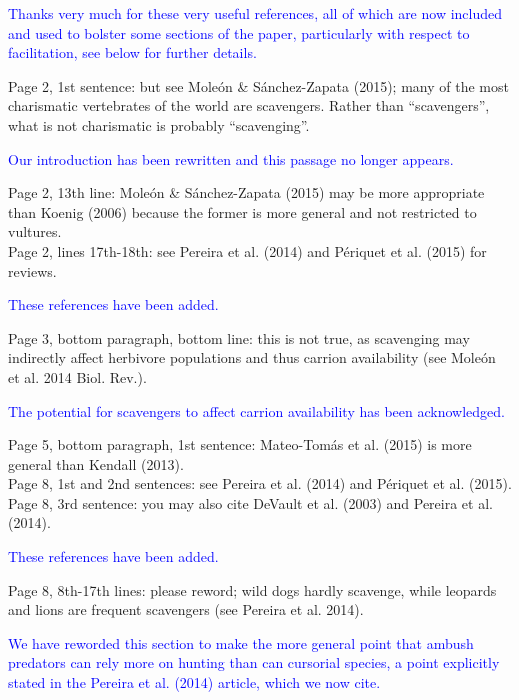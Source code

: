 \documentclass[12pt,letterpaper]{article}
\begin{document}
{\begin{enumerate}
\textcolor{blue}{Thanks very much for these very useful references, all of which are now included and used to bolster some sections of the paper, particularly with respect to facilitation, see below for further details.}

Page 2, 1st sentence: but see Mole\'{o}n \& S\'{a}nchez-Zapata (2015); many of the most charismatic vertebrates of the world are scavengers. Rather than ``scavengers'', what is not charismatic is probably ``scavenging''.

\textcolor{blue}{Our introduction has been rewritten and this passage no longer appears.}

 Page 2, 13th line: Mole\'{o}n \& S\'{a}nchez-Zapata (2015) may be more appropriate than Koenig (2006) because the former is more general and not restricted to vultures.\\
 Page 2, lines 17th-18th: see Pereira et al. (2014) and P\'{e}riquet et al. (2015) for reviews.

\textcolor{blue}{These references have been added.}

 Page 3, bottom paragraph, bottom line: this is not true, as scavenging may indirectly affect herbivore populations and thus carrion availability (see Mole\'{o}n et al. 2014 Biol. Rev.).

\textcolor{blue}{The potential for scavengers to affect carrion availability has been acknowledged.}

 Page 5, bottom paragraph, 1st sentence: Mateo-Tom\'{a}s et al. (2015) is more general than Kendall (2013).\\
 Page 8, 1st and 2nd sentences: see Pereira et al. (2014) and P\'{e}riquet et al. (2015).\\
 Page 8, 3rd sentence: you may also cite DeVault et al. (2003) and Pereira et al. (2014).

\textcolor{blue}{These references have been added.}

 Page 8, 8th-17th lines: please reword; wild dogs hardly scavenge, while leopards and lions are frequent scavengers (see Pereira et al. 2014).

\textcolor{blue}{We have reworded this section to make the more general point that ambush predators can rely more on hunting than can cursorial species, a point explicitly stated in the Pereira et al. (2014) article, which we now cite.}


\end{enumerate}}
\end{document}
